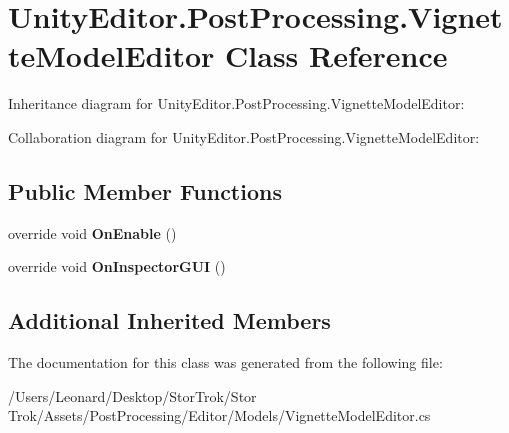 \hypertarget{class_unity_editor_1_1_post_processing_1_1_vignette_model_editor}{}\section{Unity\+Editor.\+Post\+Processing.\+Vignette\+Model\+Editor Class Reference}
\label{class_unity_editor_1_1_post_processing_1_1_vignette_model_editor}


Inheritance diagram for Unity\+Editor.\+Post\+Processing.\+Vignette\+Model\+Editor\+:


Collaboration diagram for Unity\+Editor.\+Post\+Processing.\+Vignette\+Model\+Editor\+:
\subsection*{Public Member Functions}
\begin{DoxyCompactItemize}
\item 
\mbox{\label{class_unity_editor_1_1_post_processing_1_1_vignette_model_editor_aa8b2441f6cd3fcd3f34c88d03a24be18}} 
override void {\bfseries On\+Enable} ()
\item 
\mbox{\label{class_unity_editor_1_1_post_processing_1_1_vignette_model_editor_ad058e20158c114d74518f6b0268789d6}} 
override void {\bfseries On\+Inspector\+G\+UI} ()
\end{DoxyCompactItemize}
\subsection*{Additional Inherited Members}


The documentation for this class was generated from the following file\+:\begin{DoxyCompactItemize}
\item 
/\+Users/\+Leonard/\+Desktop/\+Stor\+Trok/\+Stor Trok/\+Assets/\+Post\+Processing/\+Editor/\+Models/Vignette\+Model\+Editor.\+cs\end{DoxyCompactItemize}
